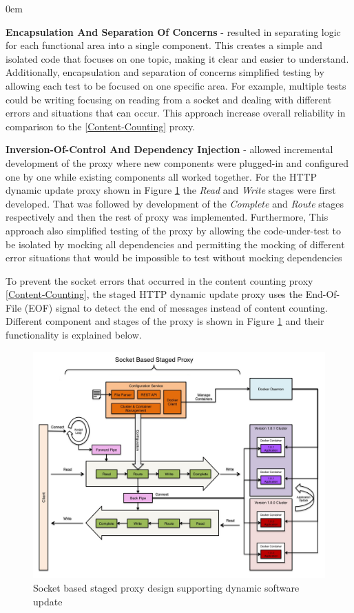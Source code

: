 \documentclass[a4paper,11pt,twoside]{report}
\begin{document}
\begin{list}{-}{}
  \itemsep0em
  \item\textbf{Encapsulation And Separation Of Concerns} - resulted in separating logic for each functional area into a single component. This creates a simple and isolated code that focuses on one topic, making it clear and easier to understand. Additionally, encapsulation and separation of concerns simplified testing by allowing each test to be focused on one specific area. For example, multiple tests could be writing focusing on reading from a socket and dealing with different errors and situations that can occur.  This approach increase overall reliability in comparison to the \ref{Content-Counting} proxy. 

  \item\textbf{Inversion-Of-Control And Dependency Injection} - allowed incremental development of the proxy where new components were plugged-in and configured one by one while existing components all worked together. For the HTTP dynamic update proxy shown in Figure \ref{proxy} the \textit{Read} and \textit{Write} stages were first developed. That was followed by development of the  \textit{Complete} and \textit{Route} stages respectively and then the rest of proxy was implemented. Furthermore, This approach also simplified testing of the proxy by allowing the code-under-test to be isolated by mocking all dependencies and permitting the mocking of different error situations that would be impossible to test without mocking dependencies  
\end{list}

\noindent
To prevent the socket errors that occurred in the content counting proxy \ref{Content-Counting}, the staged HTTP dynamic update proxy uses the End-Of-File (EOF) signal to detect the end of messages instead of content counting. Different component and stages of the proxy is shown in Figure \ref{proxy} and their functionality is explained below.\bigskip

\begin{figure}[!ht]
  \centering
     \includegraphics[scale=0.30]{proxy}
  \caption{Socket based staged proxy design supporting dynamic software update}
  \label{proxy}
\end{figure}
\end{document}
